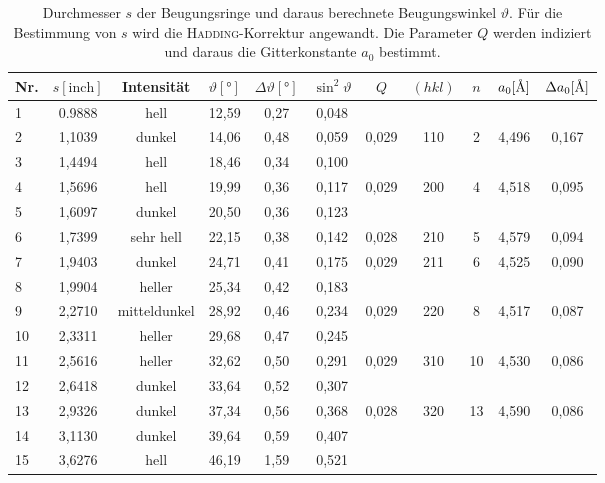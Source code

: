 \documentclass[a4paper,twoside,final]{article}
\begin{document}
\begin{table}[ht]
	\centering
	\caption{Durchmesser $s$ der Beugungsringe und daraus berechnete Beugungswinkel $\vartheta$. Für die Bestimmung von $s$ wird die \textsc{Hadding}-Korrektur angewandt. Die Parameter $Q$ werden indiziert und daraus die Gitterkonstante $a_0$ bestimmt.}
	\label{tab:Ergebnisse_ohneFilter}
	\begin{tabular}{l c c c c c | c c c c c }
		\toprule
      Nr. & $s [\text{inch}]$ & Intensität & $\vartheta [\si{\degree}]$ & $\Delta \vartheta [\si{\degree}]$ & $\sin^2 \vartheta $ & $Q$ & $(hkl)$ & $n$ & $a_0 [\si{\textup{\AA}}]$ & $\Delta a_0 [\si{\textup{\AA}}]$\\
    \midrule
    1  & 0.9888 & hell         & 12,59 & 0,27 & 0,048 &       &     &    &       &       \\
    2  & 1,1039 & dunkel       & 14,06 & 0,48 & 0,059 & 0,029 & 110 & 2  & 4,496 & 0,167 \\
    3  & 1,4494 & hell         & 18,46 & 0,34 & 0,100 &       &     &    &       &       \\
    4  & 1,5696 & hell         & 19,99 & 0,36 & 0,117 & 0,029 & 200 & 4  & 4,518 & 0,095 \\
    5  & 1,6097 & dunkel       & 20,50 & 0,36 & 0,123 &       &     &    &       &       \\
    6  & 1,7399 & sehr hell    & 22,15 & 0,38 & 0,142 & 0,028 & 210 & 5  & 4,579 & 0,094 \\
    7  & 1,9403 & dunkel       & 24,71 & 0,41 & 0,175 & 0,029 & 211 & 6  & 4,525 & 0,090 \\
    8  & 1,9904 & heller       & 25,34 & 0,42 & 0,183 &       &     &    &       &       \\
    9  & 2,2710 & mitteldunkel & 28,92 & 0,46 & 0,234 & 0,029 & 220 & 8  & 4,517 & 0,087 \\
    10 & 2,3311 & heller       & 29,68 & 0,47 & 0,245 &       &     &    &       &       \\
    11 & 2,5616 & heller       & 32,62 & 0,50 & 0,291 & 0,029 & 310 & 10 & 4,530 & 0,086 \\
    12 & 2,6418 & dunkel       & 33,64 & 0,52 & 0,307 &       &     &    &       &       \\
    13 & 2,9326 & dunkel       & 37,34 & 0,56 & 0,368 & 0,028 & 320 & 13 & 4,590 & 0,086 \\
    14 & 3,1130 & dunkel       & 39,64 & 0,59 & 0,407 &       &     &    &       &       \\
    15 & 3,6276 & hell         & 46,19 & 1,59 & 0,521 &       &     &    &       &       \\

\end{tabular}
\end{table}
\end{document}
